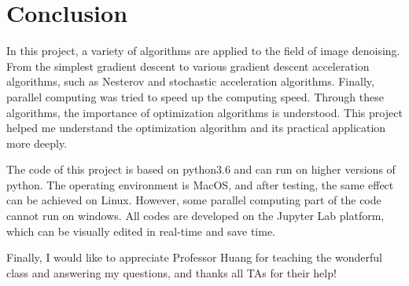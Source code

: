 \documentclass{article}
\begin{document}
\section{Conclusion}
In this project, a variety of algorithms are applied to the field of image denoising. From the simplest gradient descent to various gradient descent acceleration algorithms, such as Nesterov and stochastic acceleration algorithms. Finally, parallel computing was tried to speed up the computing speed. Through these algorithms, the importance of optimization algorithms is understood. This project helped me understand the optimization algorithm and its practical application more deeply.

The code of this project is based on python3.6 and can run on higher versions of python. The operating environment is MacOS, and after testing, the same effect can be achieved on Linux. However, some parallel computing part of the code cannot run on windows. All codes are developed on the Jupyter Lab platform, which can be visually edited in real-time and save time.

Finally, I would like to appreciate Professor Huang for teaching the wonderful class and answering my questions, and thanks all TAs for their help!




\end{document}
